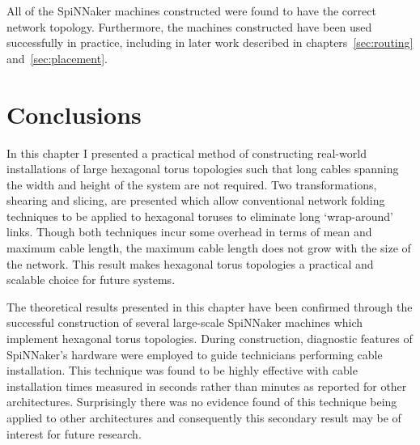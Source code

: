 			All of the SpiNNaker machines constructed were found to have the correct
			network topology. Furthermore, the machines constructed have been used
			successfully in practice, including in later work described in
			chapters~\ref{sec:routing} and~\ref{sec:placement}.
	
	\section{Conclusions}
		
		In this chapter I presented a practical method of constructing real-world
		installations of large hexagonal torus topologies such that long cables
		spanning the width and height of the system are not required. Two
		transformations, shearing and slicing, are presented which allow
		conventional network folding techniques to be applied to hexagonal toruses
		to eliminate long `wrap-around' links. Though both techniques incur some
		overhead in terms of mean and maximum cable length, the maximum cable
		length does not grow with the size of the network. This result makes
		hexagonal torus topologies a practical and scalable choice for future
		systems.
		
		The theoretical results presented in this chapter have been confirmed
		through the successful construction of several large-scale SpiNNaker
		machines which implement hexagonal torus topologies. During construction,
		diagnostic features of SpiNNaker's hardware were employed to guide
		technicians performing cable installation. This technique was found to be
		highly effective with cable installation times measured in seconds rather
		than minutes as reported for other architectures. Surprisingly there was no
		evidence found of this technique being applied to other architectures and
		consequently this secondary result may be of interest for future research.
